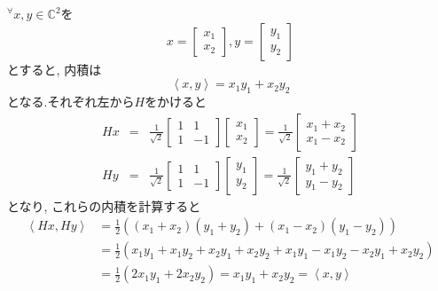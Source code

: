 \documentclass[a4paper,11pt]{jsarticle}
\begin{document}
${}^\forall x, y \in \mathbb{C}^2$を
\[
  x = \begin{bmatrix}
    x_1 \\ x_2
  \end{bmatrix}, 
  y = \begin{bmatrix}
    y_1 \\ y_2
  \end{bmatrix}
\]
とすると, 内積は
\begin{equation*}
  \left<x, y\right> = x_1y_1 + x_2y_2
\end{equation*}
となる.それぞれ左から$H$をかけると
\begin{eqnarray*}
  Hx &=& \frac{1}{\sqrt{2}} \begin{bmatrix}
    1 & 1 \\ 1 & -1
  \end{bmatrix} \begin{bmatrix}
    x_1 \\ x_2
  \end{bmatrix} = \frac{1}{\sqrt{2}} \begin{bmatrix}
    x_1 + x_2 \\ x_1 - x_2
  \end{bmatrix} \\
  Hy &=& \frac{1}{\sqrt{2}} \begin{bmatrix}
    1 & 1 \\ 1 & -1
  \end{bmatrix} \begin{bmatrix}
    y_1 \\ y_2
  \end{bmatrix} = \frac{1}{\sqrt{2}} \begin{bmatrix}
    y_1 + y_2 \\ y_1 - y_2
  \end{bmatrix}
\end{eqnarray*}
となり, これらの内積を計算すると
\begin{equation*}
  \begin{split}
    \left<Hx, Hy\right> &= \frac{1}{2}\left(
      \left(x_1+x_2\right)\left(y_1+y_2\right) + 
      \left(x_1-x_2\right)\left(y_1-y_2\right)
    \right) \\
    &= \frac{1}{2}\left(
      x_1y_1+x_1y_2+x_2y_1+x_2y_2+
      x_1y_1-x_1y_2-x_2y_1+x_2y_2
    \right) \\
    &= \frac{1}{2}\left(
      2x_1y_1 + 2x_2y_2
    \right) = x_1y_1 + x_2y_2 = \left<x, y\right>
  \end{split}
\end{equation*}
\end{document}
